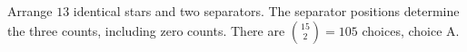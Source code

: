Arrange $13$ identical stars and two separators. The separator positions determine the three counts, including zero counts. There are $\binom{15}{2}=\boxed{105}$ choices, choice A.
